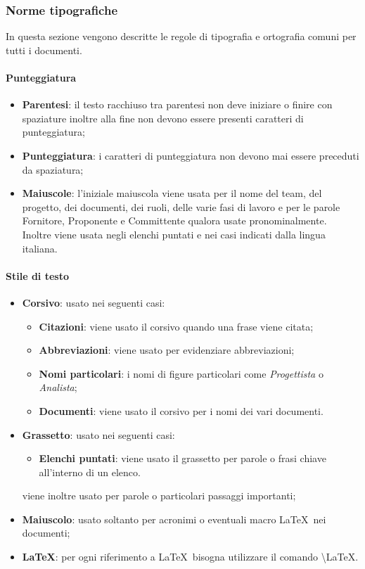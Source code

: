 \documentclass[../NormeDiProgetto.tex]{subfiles}
\begin{document}
			\subsubsection{Norme tipografiche}
				In questa sezione vengono descritte le regole di tipografia e ortografia comuni per
				tutti i documenti.
				\paragraph{Punteggiatura}
					\begin{itemize}
						\item \textbf{Parentesi}: il testo racchiuso tra parentesi non deve iniziare
						o finire con spaziature inoltre alla fine non devono essere presenti
						caratteri di punteggiatura;
						\item \textbf{Punteggiatura}: i caratteri di punteggiatura non devono mai
						essere preceduti da spaziatura;
						\item \textbf{Maiuscole}: l'iniziale maiuscola viene usata per il nome del
						team, del progetto, dei documenti, dei ruoli, delle varie fasi di lavoro e
						per le parole Fornitore, Proponente e Committente qualora usate pronominalmente.\\
						Inoltre viene usata negli elenchi puntati e nei casi indicati dalla lingua
						italiana.
					\end{itemize}
				\paragraph{Stile di testo}
					\begin{itemize}
						\item \textbf{Corsivo}: usato nei seguenti casi:
						\begin{itemize}
							\item \textbf{Citazioni}: viene usato il corsivo quando una frase viene
							citata;
							\item \textbf{Abbreviazioni}: viene usato per evidenziare abbreviazioni;  
							\item \textbf{Nomi particolari}: i nomi di figure particolari come
							\textit{Progettista} o \textit{Analista};  
							\item \textbf{Documenti}: viene usato il corsivo per i nomi dei vari
							documenti.
						\end{itemize}
						\item \textbf{Grassetto}: usato nei seguenti casi:
						\begin{itemize}
							\item \textbf{Elenchi puntati}: viene usato il grassetto per parole o
							frasi chiave all'interno di un elenco.
						\end{itemize}			
						viene inoltre usato per parole o particolari passaggi importanti;
						\item \textbf{Maiuscolo}: usato soltanto per acronimi o eventuali macro
						\LaTeX\ nei documenti;
						\item \textbf{\LaTeX }: per ogni riferimento a \LaTeX\ bisogna utilizzare il
						comando \textbackslash LaTeX.
					\end{itemize}
\end{document}
